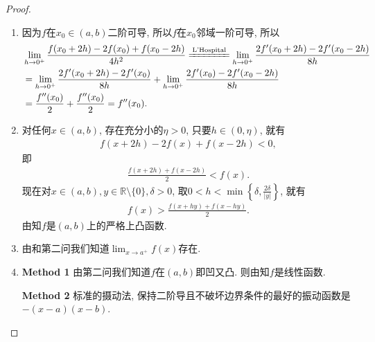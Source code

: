 \documentclass[../../main.tex]{subfiles}%
\begin{document}
\begin{proof}
\begin{enumerate}
\item 因为$f$在$x_0 \in (a,b)$二阶可导, 所以$f$在$x_0$邻域一阶可导, 所以
\begin{align*}
&\lim_{h \to 0^+} \frac{f(x_0 + 2h) - 2f(x_0) + f(x_0 - 2h)}{4h^2} \xlongequal{\text{L'Hospital}} \lim_{h \to 0^+} \frac{2f'(x_0 + 2h) - 2f'(x_0 - 2h)}{8h} \\
&= \lim_{h \to 0^+} \frac{2f'(x_0 + 2h) - 2f'(x_0)}{8h} + \lim_{h \to 0^+} \frac{2f'(x_0) - 2f'(x_0 - 2h)}{8h} \\
&= \frac{f''(x_0)}{2} + \frac{f''(x_0)}{2} = f''(x_0).
\end{align*}

\item 对任何$x \in (a,b)$, 存在充分小的$\eta > 0$, 只要$h \in (0,\eta)$, 就有
\begin{align*}
f(x + 2h) - 2f(x) + f(x - 2h) < 0,
\end{align*}
即
\begin{align*}
\frac{f(x + 2h) + f(x - 2h)}{2} < f(x).
\end{align*}
现在对$x \in (a,b), y \in \mathbb{R} \setminus \{0\}, \delta > 0$, 取$0 < h < \min\left\{\delta, \frac{2\delta}{|y|}\right\}$, 就有
\begin{align*}
f(x) > \frac{f(x + hy) + f(x - hy)}{2}.
\end{align*}
由知$f$是$(a,b)$上的严格上凸函数.

\item  由和第二问我们知道$\lim_{x \to a^+} f(x)$存在.

\item  \textbf{Method 1} 由第二问我们知道$f$在$(a,b)$即凹又凸. 则由知$f$是线性函数.

\textbf{Method 2} 标准的摄动法, 保持二阶导且不破坏边界条件的最好的振动函数是$-(x - a)(x - b)$.


\end{enumerate}
\end{proof}
\end{document}
